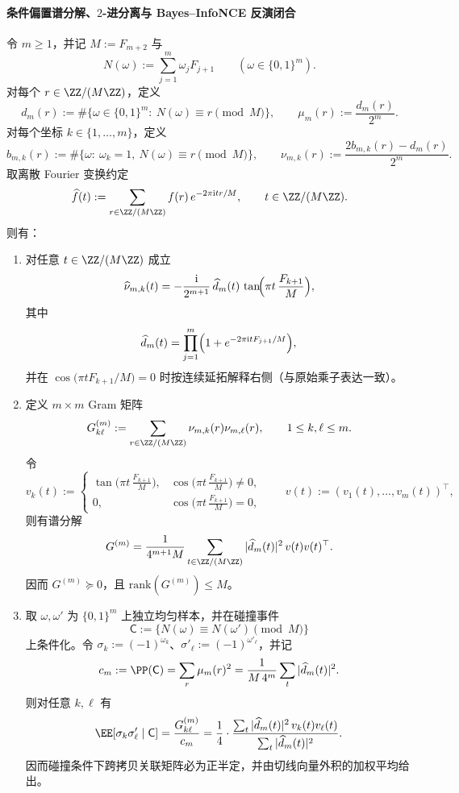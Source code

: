 \paragraph{条件偏置谱分解、\texorpdfstring{$2$}{2}-进分离与 Bayes--InfoNCE 反演闭合}

\begin{theorem}[条件偏置的切线相位因子化与碰撞关联的正半定谱分解]\label{thm:xi-fold-bias-tangent-factorization-gram-psd}
令 \(m\ge 1\)，并记 \(M:=F_{m+2}\) 与
\[
N(\omega):=\sum_{j=1}^{m}\omega_jF_{j+1}\qquad(\omega\in\{0,1\}^m).
\]
对每个 \(r\in\ZZ/(M\ZZ)\)，定义
\[
d_m(r):=\#\{\omega\in\{0,1\}^m:\ N(\omega)\equiv r\pmod M\},
\qquad
\mu_m(r):=\frac{d_m(r)}{2^m}.
\]
对每个坐标 \(k\in\{1,\dots,m\}\)，定义
\[
b_{m,k}(r):=\#\{\omega:\ \omega_k=1,\ N(\omega)\equiv r\pmod M\},
\qquad
\nu_{m,k}(r):=\frac{2b_{m,k}(r)-d_m(r)}{2^m}.
\]
取离散 Fourier 变换约定
\[
\widehat f(t):=\sum_{r\in\ZZ/(M\ZZ)}f(r)\,e^{-2\pi \mathrm{i}tr/M},
\qquad
t\in\ZZ/(M\ZZ).
\]
则有：
\begin{enumerate}
  \item 对任意 \(t\in\ZZ/(M\ZZ)\) 成立
  \[
  \widehat{\nu}_{m,k}(t)
  =
  -\frac{\mathrm{i}}{2^{m+1}}\,
  \widehat d_m(t)\,
  \tan\!\Bigl(\pi t\,\frac{F_{k+1}}{M}\Bigr),
  \]
  其中
  \[
  \widehat d_m(t)=\prod_{j=1}^{m}\Bigl(1+e^{-2\pi \mathrm{i}tF_{j+1}/M}\Bigr),
  \]
  并在 \(\cos\!\bigl(\pi tF_{k+1}/M\bigr)=0\) 时按连续延拓解释右侧（与原始乘子表达一致）。
  \item 定义 \(m\times m\) Gram 矩阵
  \[
  G_{k\ell}^{(m)}:=\sum_{r\in\ZZ/(M\ZZ)}\nu_{m,k}(r)\nu_{m,\ell}(r),
  \qquad 1\le k,\ell\le m.
  \]
  令
  \[
  v_k(t):=
  \begin{cases}
  \tan\!\bigl(\pi t\,\frac{F_{k+1}}{M}\bigr),& \cos\!\bigl(\pi t\,\frac{F_{k+1}}{M}\bigr)\neq 0,\\
  0,& \cos\!\bigl(\pi t\,\frac{F_{k+1}}{M}\bigr)=0,
  \end{cases}
  \qquad
  v(t):=(v_1(t),\dots,v_m(t))^\top,
  \]
  则有谱分解
  \[
  G^{(m)}
  =
  \frac{1}{4^{m+1}M}
  \sum_{t\in\ZZ/(M\ZZ)}
  |\widehat d_m(t)|^2\,v(t)v(t)^\top.
  \]
  因而 \(G^{(m)}\succeq 0\)，且 \(\mathrm{rank}(G^{(m)})\le M\)。
  \item 取 \(\omega,\omega'\) 为 \(\{0,1\}^m\) 上独立均匀样本，并在碰撞事件
  \[
  \mathsf C:=\{N(\omega)\equiv N(\omega')\pmod M\}
  \]
  上条件化。令 \(\sigma_k:=(-1)^{\omega_k}\)、\(\sigma'_\ell:=(-1)^{\omega'_\ell}\)，并记
  \[
  c_m:=\PP(\mathsf C)
  =\sum_r\mu_m(r)^2
  =\frac{1}{M\,4^m}\sum_t|\widehat d_m(t)|^2.
  \]
  则对任意 \(k,\ell\) 有
  \[
  \EE[\sigma_k\sigma'_\ell\mid \mathsf C]
  =\frac{G_{k\ell}^{(m)}}{c_m}
  =\frac14\cdot
  \frac{\sum_t|\widehat d_m(t)|^2\,v_k(t)v_\ell(t)}
       {\sum_t|\widehat d_m(t)|^2}.
  \]
  因而碰撞条件下跨拷贝关联矩阵必为正半定，并由切线向量外积的加权平均给出。
\end{enumerate}
\end{theorem}
